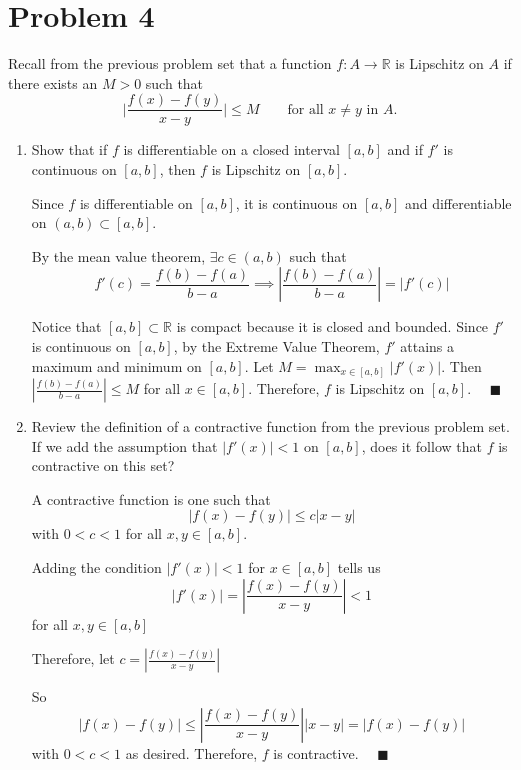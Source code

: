 \documentclass[12pt]{article}
\newcommand{\R}{\mathbb{R}}
\newcommand{\qed}{\quad \blacksquare}
\newcommand{\abs}[1]{\left\vert #1 \right\vert}
\begin{document}
\pagebreak

\section{Problem 4 }
Recall from the previous problem set that a function $f:A\to\mathbb{R}$ is Lipschitz on $A$ if there exists an $M>0$ such that
\begin{equation*}
	\bigg|\frac{f(x)-f(y)}{x-y} \bigg|\leq M \qquad\text{for all }x\neq y\text{ in }A.
\end{equation*}
\begin{enumerate}
	\item Show that if $f$ is differentiable on a closed interval $[a,b]$ and if $f'$ is continuous on $[a,b]$, then $f$ is Lipschitz on $[a,b]$.
	
        \color{blue}
            Since $f$ is differentiable on $[a, b]$, it is continuous on $[a, b]$ and differentiable on $(a, b)\subset [a, b]$.

            By the mean value theorem, $\exists c \in (a, b)$ such that 
            \[f'(c) = \frac{f(b) - f(a)}{b - a} \implies \abs{\frac{f(b) - f(a)}{b - a}} = \abs{f'(c)}\]

            Notice that $[a, b] \subset \R$ is compact because it is closed and bounded. Since $f'$ is continuous on $[a, b]$, by the Extreme Value Theorem, $f'$ attains a maximum and minimum on $[a, b]$. Let $M = \max_{x \in [a, b]} \abs{f'(x)}$. Then $\abs{\frac{f(b) - f(a)}{b - a}} \leq M$ for all $x \in [a, b]$. Therefore, $f$ is Lipschitz on $[a, b]$. $\qed$
        \color{black}

	\item Review the definition of a contractive function from the previous problem set. If we add the assumption that $|f'(x)|<1$ on $[a,b]$, does it follow that $f$ is contractive on this set?
    
        \color{blue}
            A contractive function is one such that 
            \[\abs{f(x) - f(y)} \leq c\abs{x - y}\]
            with $0 < c < 1$ for all $x, y \in [a, b]$.

            Adding the condition $\abs{f'(x)} < 1$ for $x \in [a, b]$ tells us 
            \[\abs{f'(x)} = \abs{\frac{f(x) - f(y)}{x - y}} < 1\] 
            for all $x, y \in [a, b]$ 

            Therefore, let $c = \abs{\frac{f(x) - f(y)}{x - y}}$
        
            So 
            \[\abs{f(x) - f(y)} \leq \abs{\frac{f(x) - f(y)}{x - y}} \abs{x - y} = \abs{f(x) - f(y)}\]
            with $0 < c < 1$ as desired. Therefore, $f$ is contractive. $\qed$
        \color{black}
\end{enumerate}
\end{document}
